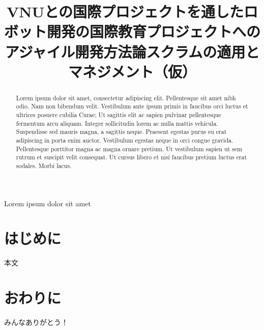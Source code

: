 \documentclass[paper]{jrsj}
\title{
VNUとの国際プロジェクトを通したロボット開発の国際教育プロジェクトへの
アジャイル開発方法論スクラムの適用とマネジメント（仮）
}
\subtitle{}
\begin{document}
\begin{abstract}
Lorem ipsum dolor sit amet, consectetur adipiscing elit. Pellentesque sit amet nibh odio. Nam non bibendum velit. Vestibulum ante ipsum primis in faucibus orci luctus et ultrices posuere cubilia Curae; Ut sagittis elit ac sapien pulvinar pellentesque fermentum arcu aliquam. Integer sollicitudin lorem ac nulla mattis vehicula. Suspendisse sed mauris magna, a sagittis neque. Praesent egestas purus eu erat adipiscing in porta enim auctor. Vestibulum egestas neque in orci congue gravida. Pellentesque porttitor magna ac magna ornare pretium. Ut vestibulum sapien ut sem rutrum et suscipit velit consequat. Ut cursus libero et nisi faucibus pretium luctus erat sodales. Morbi lacus.
\end{abstract}
\begin{keywords}
Lorem ipsum dolor sit amet
\end{keywords}
\maketitle
\small
\section{はじめに}
本文

\section{おわりに}

\newpage %
\begin{acknowledgements}
みんなありがとう！
\end{acknowledgements}

\begin{thebibliography}{99}
\bibitem{}
\end{thebibliography}

\appendix 

\begin{biography}
\end{biography}
\end{document}

